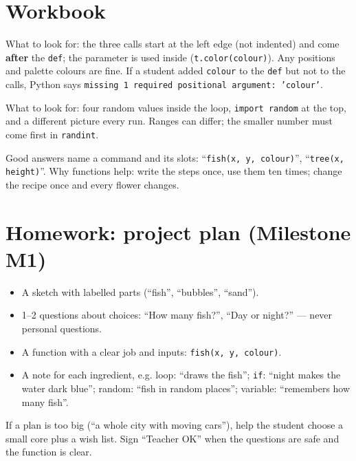 
\section{Workbook}
\begin{answer}
What to look for: the three calls start at the left edge (not indented) and come \textbf{after} the \texttt{def}; the parameter is used inside (\texttt{t.color(colour)}). Any positions and palette colours are fine. If a student added \texttt{colour} to the \texttt{def} but not to the calls, Python says \texttt{missing 1 required positional argument: 'colour'}.
\end{answer}

\begin{answer}
What to look for: four random values inside the loop, \texttt{import random} at the top, and a different picture every run. Ranges can differ; the smaller number must come first in \texttt{randint}.
\end{answer}

\begin{answer}[Reflection]
Good answers name a command and its slots: \enquote{\texttt{fish(x, y, colour)}}, \enquote{\texttt{tree(x, height)}}. Why functions help: write the steps once, use them ten times; change the recipe once and every flower changes.
\end{answer}

\section{Homework: project plan (Milestone M1)}
\begin{answer}
\begin{itemize}[leftmargin=1.2em,itemsep=1pt]
  \item A sketch with labelled parts (\enquote{fish}, \enquote{bubbles}, \enquote{sand}).
  \item 1--2 questions about choices: \enquote{How many fish?}, \enquote{Day or night?} --- never personal questions.
  \item A function with a clear job and inputs: \texttt{fish(x, y, colour)}.
  \item A note for each ingredient, e.g. loop: \enquote{draws the fish}; \texttt{if}: \enquote{night makes the water dark blue}; random: \enquote{fish in random places}; variable: \enquote{remembers how many fish}.
\end{itemize}
If a plan is too big (\enquote{a whole city with moving cars}), help the student choose a small core plus a wish list. Sign \enquote{Teacher OK} when the questions are safe and the function is clear.
\end{answer}


